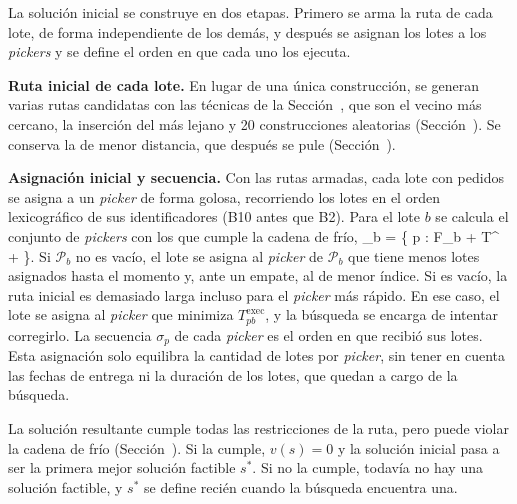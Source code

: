 \startsubsection[title={Construcción de la solución inicial}, reference=sec:hc_solucion_inicial]

La solución inicial se construye en dos etapas. Primero se arma la ruta de
cada lote, de forma independiente de los demás, y después se asignan los
lotes a los {\em pickers} y se define el orden en que cada uno los ejecuta.

{\bf Ruta inicial de cada lote.} En lugar de una única construcción, se
generan varias rutas candidatas con las técnicas de la
Sección~, que son el vecino más cercano, la inserción del
más lejano y 20 construcciones aleatorias
(Sección~). Se conserva la de menor
distancia, que después se pule (Sección~).

{\bf Asignación inicial y secuencia.} Con las rutas armadas, cada lote con
pedidos se asigna a un {\em picker} de forma golosa, recorriendo los lotes en
el orden lexicográfico de sus identificadores (B10 antes que B2). Para el lote $b$ se calcula el conjunto de
{\em pickers} con los que cumple la cadena de frío,
\startformula
	_b = \left\{ p \in {} : F_b +  \leq T^{} + \varepsilon \right\}.
\stopformula
Si $\mathcal{P}_b$ no es vacío, el lote se asigna al {\em picker} de
$\mathcal{P}_b$ que tiene menos lotes asignados hasta el momento y, ante un
empate, al de menor índice. Si es vacío, la ruta inicial es
demasiado larga incluso para el {\em picker} más rápido. En ese caso, el lote
se asigna al {\em picker} que minimiza $T^{\text{exec}}_{pb}$, y la búsqueda se
encarga de intentar corregirlo. La secuencia $\sigma_p$ de cada {\em picker} es el orden en que
recibió sus lotes. Esta asignación solo equilibra la cantidad de lotes por
{\em picker}, sin tener en cuenta las fechas de entrega ni la duración de los
lotes, que quedan a cargo de la búsqueda.

La solución resultante cumple todas las restricciones de la ruta, pero puede
violar la cadena de frío (Sección~). Si la cumple,
$v(s) = 0$ y la solución inicial pasa a ser la primera mejor solución
factible $s^*$. Si no la cumple, todavía no hay una solución factible, y
$s^*$ se define recién cuando la búsqueda encuentra una.

\stopsubsection

\startsubsection[title={Búsqueda estocástica}, reference=sec:hc_busqueda]

